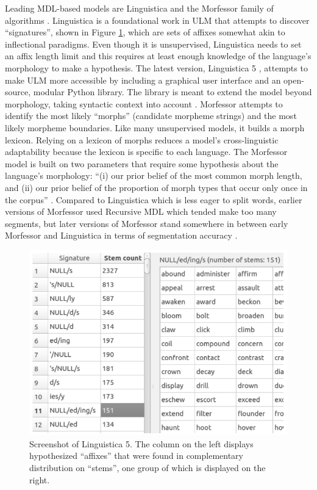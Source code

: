 \documentclass[12pt]{article}
\begin{document}
Leading MDL-based models are Linguistica \cite{goldsmith_linguistica:_2000,goldsmith_unsupervised_2001} and the Morfessor family of algorithms \cite{creutz_unsupervised_2005a,creutz_unsupervised_2007}. Linguistica is a foundational work in ULM that attempts to discover “signatures”, shown in Figure \ref{fig:signatures}, which are sets of affixes somewhat akin to inflectional paradigms. Even though it is unsupervised, Linguistica needs to set an affix length limit and this requires at least enough knowledge of the language’s morphology to make a hypothesis. The latest version, Linguistica 5 \cite{lee_linguistica_2016}, attempts to make ULM more accessible by including a graphical user interface and an open-source, modular Python library. The library is meant to extend the model beyond morphology, taking syntactic context into account \cite{nicolai_morphological_2017}. Morfessor \cite{creutz_unsupervised_2005a,creutz_inducing_2005b,creutz_unsupervised_2007} attempts to identify the most likely ``morphs'' (candidate morpheme strings) and the most likely morpheme boundaries. Like many unsupervised models, it builds a morph lexicon. Relying on a lexicon of morphs reduces a model's cross-linguistic adaptability because the lexicon is specific to each language. The Morfessor model is built on two parameters that require some hypothesis about the language's morphology: ``(i) our prior belief of the most common morph length, and (ii) our prior belief of the proportion of morph types that occur only once in the corpus'' \cite[page 281]{creutz_unsupervised_2003}. Compared to Linguistica which is less eager to split words, earlier versions of Morfessor used Recursive MDL which tended make too many segments, but later versions of Morfessor stand somewhere in between early Morfessor and Linguistica in terms of segmentation accuracy \cite{creutz_unsupervised_2003}. 

\begin{figure}[ht]
\label{fig:signatures}
\begin{center}
\includegraphics[width=0.5\columnwidth]{Linguistica5-signatures.PNG}
\caption{Screenshot of Linguistica 5. The column on the left displays hypothesized ``affixes'' that were found in complementary distribution on ``stems'', one group of which is displayed on the right.}
\end{center}
\end{figure}
\end{document}
